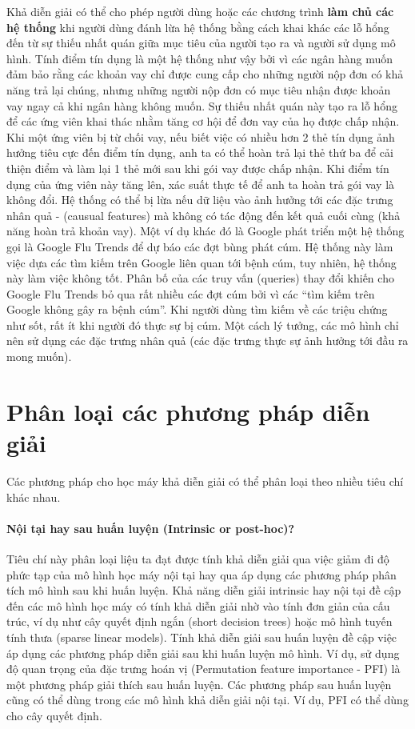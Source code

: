 Khả diễn giải có thể cho phép người dùng hoặc các chương trình \textbf{làm chủ các hệ thống} khi người dùng đánh lừa hệ thống bằng cách khai khác các lỗ hổng đến từ sự thiếu nhất quán giữa mục tiêu của người tạo ra và người sử dụng mô hình. Tính điểm tín dụng là một hệ thống như vậy bởi vì các ngân hàng muốn đảm bảo rằng các khoản vay chỉ được cung cấp cho những người nộp đơn có khả năng trả lại chúng, nhưng những người nộp đơn có mục tiêu nhận được khoản vay ngay cả khi ngân hàng không muốn. Sự thiếu nhất quán này tạo ra lỗ hổng để các ứng viên khai thác nhằm tăng cơ hội để đơn vay của họ được chấp nhận. Khi một ứng viên bị từ chối vay, nếu biết việc có nhiều hơn 2 thẻ tín dụng ảnh hưởng tiêu cực đến điểm tín dụng, anh ta có thể hoàn trả lại thẻ thứ ba để cải thiện điểm và làm lại 1 thẻ mới sau khi gói vay được chấp nhận. Khi điểm tín dụng của ứng viên này tăng lên, xác suất thực tế để anh ta hoàn trả gói vay là không đổi. Hệ thống có thể bị lừa nếu dữ liệu vào ảnh hưởng tới các đặc trưng nhân quả - (causual features) mà không có tác động đến kết quả cuối cùng (khả năng hoàn trả khoản vay). Một ví dụ khác đó là Google phát triển một hệ thống gọi là Google Flu Trends để dự báo các đợt bùng phát cúm. Hệ thống này làm việc dựa các tìm kiếm trên Google liên quan tới bệnh cúm, tuy nhiên, hệ thống này làm việc không tốt. Phân bố của các truy vấn (queries) thay đổi khiến cho Google Flu Trends bỏ qua rất nhiều các đợt cúm bởi vì các ``tìm kiếm trên Google không gây ra bệnh cúm''. Khi người dùng tìm kiếm về các triệu chứng như sốt, rất ít khi người đó thực sự bị cúm. Một cách lý tưởng, các mô hình chỉ nên sử dụng các đặc trưng nhân quả (các đặc trưng thực sự ảnh hưởng tới đầu ra mong muốn).

\clearpage

\section{Phân loại các phương pháp diễn giải}

Các phương pháp cho học máy khả diễn giải có thể phân loại theo nhiều tiêu chí khác nhau.

\paragraph{Nội tại hay sau huấn luyện (Intrinsic or post-hoc)?} Tiêu chí này phân loại liệu ta đạt được tính khả diễn giải qua việc giảm đi độ phức tạp của mô hình học máy nội tại hay qua áp dụng các phương pháp phân tích mô hình sau khi huấn luyện. Khả năng diễn giải intrinsic hay nội tại đề cập đến các mô hình học máy có tính khả diễn giải nhờ vào tính đơn giản của cấu trúc, ví dụ như cây quyết định ngắn (short decision trees) hoặc mô hình tuyến tính thưa (sparse linear models). Tính khả diễn giải sau huấn luyện đề cập việc áp dụng các phương pháp diễn giải sau khi huấn luyện mô hình. Ví dụ, sử dụng độ quan trọng của đặc trưng hoán vị (Permutation feature importance - PFI) là một phương pháp giải thích sau huấn luyện. Các phương pháp sau huấn luyện cũng có thể dùng trong các mô hình khả diễn giải nội tại. Ví dụ, PFI có thể dùng cho cây quyết định. 

